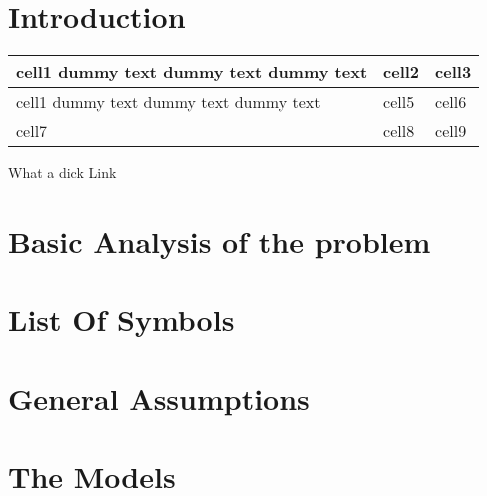 \documentclass{mcmthesis}
\title{}
\date{\today}
\begin{document}






\tableofcontents
\newpage




\section{Introduction}

  \begin{center}
  \begin{tabular}{ | m{5em} | m{1cm}| m{2cm} | } 
    \hline
    cell1 dummy text dummy text dummy text& cell2 & cell3 \\ 
    \hline
    cell1 dummy text dummy text dummy text & cell5 & cell6 \\ 
    \hline
    cell7 & cell8 & cell9 \\ 
    \hline
  \end{tabular}
  \end{center}

  
  What a dick\cite{yaggi2006sleep}
Link\cite{WinNT}
\section{Basic Analysis of the problem}
  

\section{List Of Symbols}
  

\section{General Assumptions}
  

\section{The Models}
  
\end{document}
